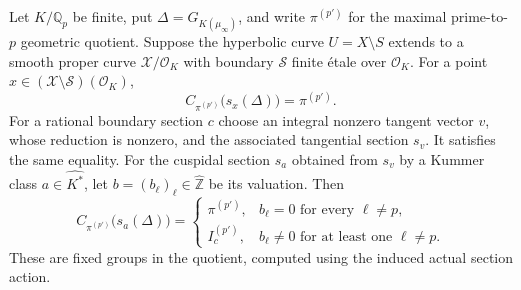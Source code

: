 \documentclass[11pt,a4paper]{article}
\begin{document}
Let $K/\mathbb Q_p$ be finite, put
$\Delta=G_{K(\mu_\infty)}$, and write $\pi^{(p')}$ for the maximal
prime-to-$p$ geometric quotient.  Suppose the hyperbolic curve
$U=X\setminus S$ extends to
a smooth proper curve $\mathscr X/\mathcal O_K$ with boundary
$\mathscr S$ finite \'etale over $\mathcal O_K$.
For a point $x\in(\mathscr X\setminus\mathscr S)(\mathcal O_K)$,
\[
       C_{\pi^{(p')}}\bigl(s_x(\Delta)\bigr)=\pi^{(p')}.
\]
For a rational boundary section $c$ choose an integral nonzero tangent
vector $v$, whose reduction is nonzero, and the associated tangential
section $s_v$.  It satisfies the same equality.  For the cuspidal
section $s_a$ obtained from $s_v$ by a Kummer class
$a\in\widehat{K^*}$, let
$b=(b_\ell)_\ell\in\widehat{\mathbb Z}$ be its valuation.  Then
\[
 C_{\pi^{(p')}}\bigl(s_a(\Delta)\bigr)=
 \begin{cases}
       \pi^{(p')},& b_\ell=0\text{ for every }\ell\ne p,\\
       I_c^{(p')},& b_\ell\ne0\text{ for at least one }\ell\ne p.
 \end{cases}                                                   \tag{E.4}
\]
These are fixed groups in the quotient, computed using the induced
actual section action.
\end{document}
